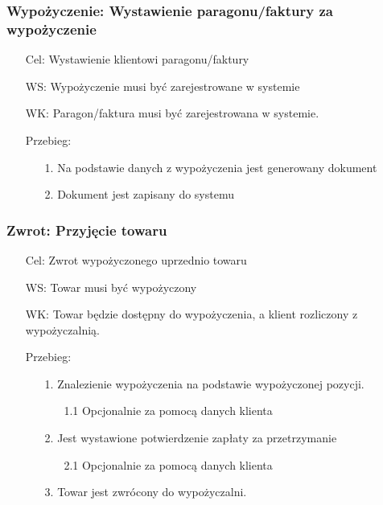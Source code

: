 \documentclass{article}
\begin{document}
\subsubsection{Wypożyczenie: Wystawienie paragonu/faktury za wypożyczenie}
\begin{enumerate}
	\item[Cel:] Wystawienie klientowi paragonu/faktury
	\item[WS:] Wypożyczenie musi być zarejestrowane w systemie
	\item[WK:]  Paragon/faktura musi być zarejestrowana w systemie.
	\item[Przebieg:]
	\begin{enumerate}
		\item [1.]Na podstawie danych z wypożyczenia jest generowany dokument
		\item [2.]Dokument jest zapisany do systemu
	\end{enumerate}
\end{enumerate}

\subsubsection{Zwrot: Przyjęcie towaru}
\begin{enumerate}
\item[Cel:] Zwrot wypożyczonego uprzednio towaru
	\item[WS:] Towar musi być wypożyczony
	\item[WK:]  Towar będzie dostępny do wypożyczenia, a klient rozliczony z wypożyczalnią.
	\item[Przebieg:]
	\begin{enumerate}
		\item [1.]Znalezienie wypożyczenia na podstawie wypożyczonej pozycji.
		\begin{enumerate}
			\item [1.1] Opcjonalnie za pomocą danych klienta 
		\end{enumerate}
		\item [2.]Jest wystawione potwierdzenie zapłaty za przetrzymanie
			\begin{enumerate}
			\item [2.1] Opcjonalnie za pomocą danych klienta 
		\end{enumerate}
		\item [3.]Towar jest zwrócony do wypożyczalni.
	\end{enumerate}
\end{enumerate}
\end{document}
